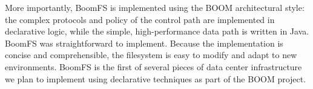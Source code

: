 \documentclass{article}
\begin{document}
More importantly, BoomFS is implemented using the BOOM architectural
style: the complex protocols and policy of the control path are
implemented in declarative logic, while the simple, high-performance
data path is written in Java. BoomFS was straightforward to
implement. Because the implementation is concise and comprehensible,
the filesystem is easy to modify and adapt to new environments. BoomFS
is the first of several pieces of data center infrastructure we plan
to implement using declarative techniques as part of the BOOM project.



\end{document}
